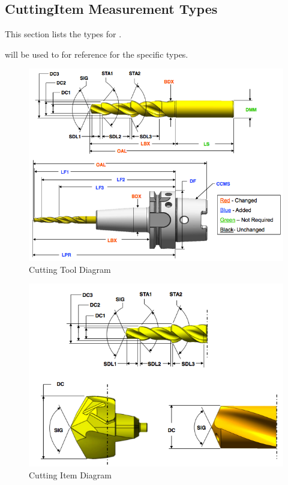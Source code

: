 \subsection{CuttingItem Measurement Types} \label{sec:CuttingItem Measurement Types}


This section lists the  types for .

will be used to for reference for the  specific  types.

\begin{figure}[ht]
  \centering
    \includegraphics[width=1.0\textwidth]{figures/Cutting Tool.png}
  \caption{Cutting Tool Diagram}
  \label{fig:Cutting Tool Diagram}
\end{figure}

\FloatBarrier


\begin{figure}[ht]
  \centering
    \includegraphics[width=1.0\textwidth]{figures/Cutting Item.png}
  \caption{Cutting Item Diagram}
  \label{fig:Cutting Item Diagram}
\end{figure}


